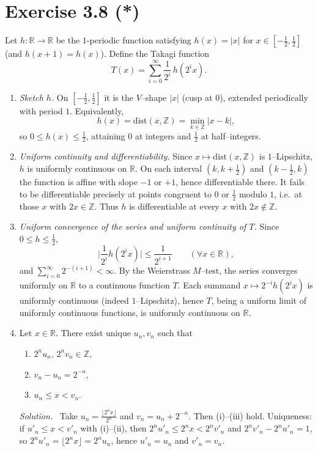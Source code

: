 \documentclass[11pt,a4paper]{article}
\newenvironment{solution}{\par\noindent\textit{Solution.}\ }{\par\vspace{0.5em}}
\begin{document}
\section*{Exercise 3.8 (*)}
Let $h:\mathbb{R}\to\mathbb{R}$ be the $1$-periodic function satisfying $h(x)=|x|$ for $x\in[-\tfrac12,\tfrac12]$
(and $h(x+1)=h(x)$). Define the Takagi function
\[
T(x)=\sum_{i=0}^{\infty}\frac1{2^i}\,h(2^i x).
\]

\begin{enumerate}
\renewcommand\labelenumi{(\alph{enumi})}

\item \textit{Sketch $h$.} On $[-\tfrac12,\tfrac12]$ it is the $V$--shape $|x|$ (cusp at $0$), extended periodically
with period $1$. Equivalently,
\[
h(x)=\mathrm{dist}(x,\mathbb{Z})=\min_{k\in\mathbb{Z}}|x-k|,
\]
so $0\le h(x)\le \tfrac12$, attaining $0$ at integers and $\tfrac12$ at half--integers.

\item \textit{Uniform continuity and differentiability.} Since $x\mapsto \mathrm{dist}(x,\mathbb{Z})$ is $1$--Lipschitz,
$h$ is uniformly continuous on $\mathbb{R}$. On each interval $(k,k+\tfrac12)$ and $(k-\tfrac12,k)$ the function is affine with
slope $-1$ or $+1$, hence differentiable there. It fails to be differentiable precisely at points congruent to
$0$ or $\tfrac12$ modulo $1$, i.e.\ at those $x$ with $2x\in\mathbb{Z}$. Thus $h$ is differentiable at every $x$ with $2x\notin\mathbb{Z}$.

\item \textit{Uniform convergence of the series and uniform continuity of $T$.}
Since $0\le h\le \tfrac12$,
\[
\Big|\frac1{2^i}h(2^i x)\Big|\le \frac{1}{2^{i+1}}\qquad(\forall x\in\mathbb{R}),
\]
and $\sum_{i=0}^\infty 2^{-(i+1)}<\infty$. By the Weierstrass $M$--test, the series converges uniformly on $\mathbb{R}$
to a continuous function $T$. Each summand $x\mapsto 2^{-i}h(2^i x)$ is uniformly continuous (indeed $1$--Lipschitz),
hence $T$, being a uniform limit of uniformly continuous functions, is uniformly continuous on $\mathbb{R}$.

\item Let $x\in\mathbb{R}$. There exist unique $u_n,v_n$ such that
\begin{enumerate}
\renewcommand\labelenumii{(\roman{enumii})}
\item $2^n u_n,\,2^n v_n\in\mathbb{Z}$,
\item $v_n-u_n=2^{-n}$,
\item $u_n\le x< v_n$.
\end{enumerate}
\begin{solution}
Take $u_n=\frac{\lfloor 2^n x\rfloor}{2^n}$ and $v_n=u_n+2^{-n}$. Then (i)--(iii) hold. Uniqueness:
if $u'_n\le x< v'_n$ with (i)--(ii), then $2^n u'_n\le 2^n x<2^n v'_n$ and $2^n v'_n-2^n u'_n=1$, so
$2^n u'_n=\lfloor 2^n x\rfloor=2^n u_n$, hence $u'_n=u_n$ and $v'_n=v_n$.
\end{solution}


\end{enumerate}
\end{document}
